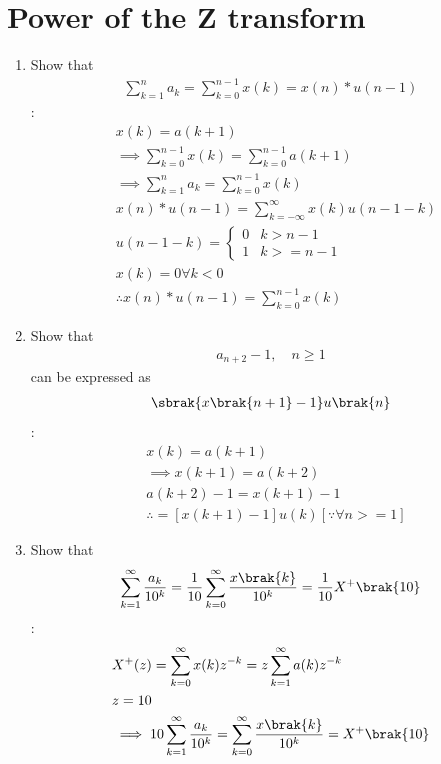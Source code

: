 \documentclass[journal,12pt,twocolumn]{IEEEtran}
\renewcommand\thesection{\arabic{section}}
\begin{document}
\section{Power of the Z transform}
\begin{enumerate}[label=\thesection.\arabic*,ref=\thesection.\theenumi]
\item Show that 
\begin{align}
	\sum_{k=1}^{n}a_k = 
	\sum_{k=0}^{n-1}x(k) = x(n)*u(n-1)
\end{align}
\solution:
\begin{align}
& x(k)=a(k+1)\\
&\implies \sum_{k=0}^{n-1} x(k)=\sum_{k=0}^{n-1} a(k+1)\\
&\implies \sum_{k=1}^{n}a_{k} = \sum_{k=0}^{n-1}x(k)\\
& x(n)*u(n-1)=\sum_{k=-\infty}^{\infty} x(k) u(n-1-k)\\
&u(n-1-k)=\begin{cases}
	0 & k>n-1\\
	1 & k>=n-1
\end{cases}\\
&x(k)=0 \forall k<0\\
&\therefore x(n)*u(n-1)=\sum_{k=0}^{n-1} x(k)
\end{align}
\item Show that 
\begin{align}
a_{n+2}-1, \quad n \ge 1
\end{align}
can be expressed as 
\begin{align}
	\sbrak{x\brak{n+1}-1}u\brak{n}
\end{align}
\solution:
\begin{align}
&x(k)=a(k+1)\\
&\implies x(k+1)=a(k+2)\\
&a(k+2)-1=x(k+1)-1\\
&\therefore =[x(k+1)-1]u(k)[\because \forall n>=1]
\end{align}
 \item Show that 
\begin{align}
	\sum_{k=1}^{\infty}\frac{a_k}{10^k}= 
	\frac{1}{10}\sum_{k=0}^{\infty}\frac{x\brak{k}}{10^k} =\frac{1}{10}X^{+}\brak{{10}}
\end{align}
\solution:
\begin{align}
&X^{+}(z)=\sum_{k=0}^{\infty} x(k)z^{-k}=z\sum_{k=1}^{\infty} a(k) z^{-k}\\
&z=10\\
&\implies 10\sum_{k=1}^{\infty}\frac{a_k}{10^k}=\sum_{k=0}^{\infty}\frac{x\brak{k}}{10^k} =X^{+}\brak{{10}}\\

\end{align}
\end{enumerate}
\end{document}
